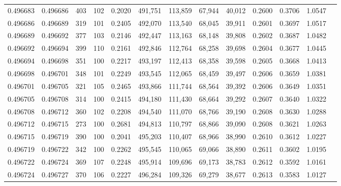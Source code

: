\begin{tabular}{rrrrrrrrrrrrr}
0.496683 & 0.496686 &   403 & 102 &                                     0.2020 & 491,751 & 113,859 &  67,944 &  40,012 & 0.2600 & 0.3706 & 1.0547 \\
0.496686 & 0.496689 &   319 & 101 &                                     0.2405 & 492,070 & 113,540 &  68,045 &  39,911 & 0.2601 & 0.3697 & 1.0517 \\
0.496689 & 0.496692 &   377 & 103 &                                     0.2146 & 492,447 & 113,163 &  68,148 &  39,808 & 0.2602 & 0.3687 & 1.0482 \\
0.496692 & 0.496694 &   399 & 110 &                                     0.2161 & 492,846 & 112,764 &  68,258 &  39,698 & 0.2604 & 0.3677 & 1.0445 \\
0.496694 & 0.496698 &   351 & 100 &                                     0.2217 & 493,197 & 112,413 &  68,358 &  39,598 & 0.2605 & 0.3668 & 1.0413 \\
0.496698 & 0.496701 &   348 & 101 &                                     0.2249 & 493,545 & 112,065 &  68,459 &  39,497 & 0.2606 & 0.3659 & 1.0381 \\
0.496701 & 0.496705 &   321 & 105 &                                     0.2465 & 493,866 & 111,744 &  68,564 &  39,392 & 0.2606 & 0.3649 & 1.0351 \\
0.496705 & 0.496708 &   314 & 100 &                                     0.2415 & 494,180 & 111,430 &  68,664 &  39,292 & 0.2607 & 0.3640 & 1.0322 \\
0.496708 & 0.496712 &   360 & 102 &                                     0.2208 & 494,540 & 111,070 &  68,766 &  39,190 & 0.2608 & 0.3630 & 1.0288 \\
0.496712 & 0.496715 &   273 & 100 &                                     0.2681 & 494,813 & 110,797 &  68,866 &  39,090 & 0.2608 & 0.3621 & 1.0263 \\
0.496715 & 0.496719 &   390 & 100 &                                     0.2041 & 495,203 & 110,407 &  68,966 &  38,990 & 0.2610 & 0.3612 & 1.0227 \\
0.496719 & 0.496722 &   342 & 100 &                                     0.2262 & 495,545 & 110,065 &  69,066 &  38,890 & 0.2611 & 0.3602 & 1.0195 \\
0.496722 & 0.496724 &   369 & 107 &                                     0.2248 & 495,914 & 109,696 &  69,173 &  38,783 & 0.2612 & 0.3592 & 1.0161 \\
0.496724 & 0.496727 &   370 & 106 &                                     0.2227 & 496,284 & 109,326 &  69,279 &  38,677 & 0.2613 & 0.3583 & 1.0127 \\

\end{tabular}
